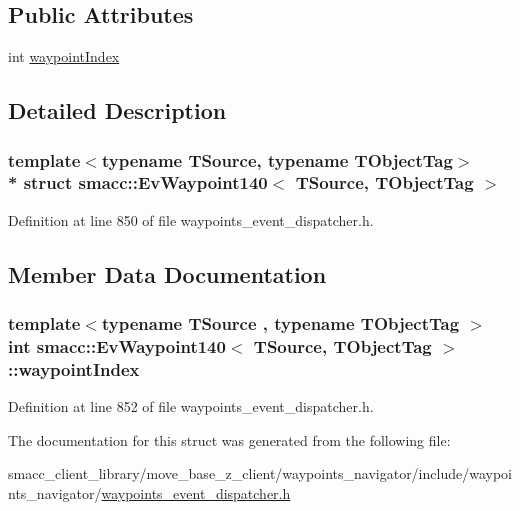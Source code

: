 \subsection*{Public Attributes}
\begin{DoxyCompactItemize}
\item 
int \hyperlink{structsmacc_1_1EvWaypoint140_a4126a97f2b6fd721dad891f34ed4b292}{waypoint\+Index}
\end{DoxyCompactItemize}


\subsection{Detailed Description}
\subsubsection*{template$<$typename T\+Source, typename T\+Object\+Tag$>$\\*
struct smacc\+::\+Ev\+Waypoint140$<$ T\+Source, T\+Object\+Tag $>$}



Definition at line 850 of file waypoints\+\_\+event\+\_\+dispatcher.\+h.



\subsection{Member Data Documentation}
\subsubsection[{\texorpdfstring{waypoint\+Index}{waypointIndex}}]{\setlength{\rightskip}{0pt plus 5cm}template$<$typename T\+Source , typename T\+Object\+Tag $>$ int {\bf smacc\+::\+Ev\+Waypoint140}$<$ T\+Source, T\+Object\+Tag $>$\+::waypoint\+Index}\hypertarget{structsmacc_1_1EvWaypoint140_a4126a97f2b6fd721dad891f34ed4b292}{}\label{structsmacc_1_1EvWaypoint140_a4126a97f2b6fd721dad891f34ed4b292}


Definition at line 852 of file waypoints\+\_\+event\+\_\+dispatcher.\+h.



The documentation for this struct was generated from the following file\+:\begin{DoxyCompactItemize}
\item 
smacc\+\_\+client\+\_\+library/move\+\_\+base\+\_\+z\+\_\+client/waypoints\+\_\+navigator/include/waypoints\+\_\+navigator/\hyperlink{waypoints__event__dispatcher_8h}{waypoints\+\_\+event\+\_\+dispatcher.\+h}\end{DoxyCompactItemize}
